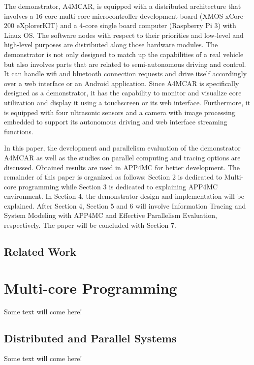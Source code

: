The demonstrator, A4MCAR, is equipped with a distributed architecture that involves a 16-core multi-core microcontroller development board (XMOS xCore-200 eXplorerKIT) and a 4-core single board computer (Raspberry Pi 3) with Linux OS. The software nodes with respect to their priorities and low-level and high-level purposes are distributed along those hardware modules. The demonstrator is not only designed to match up the capabilities of a real vehicle but also involves parts that are related to semi-autonomous driving and control. It can handle wifi and bluetooth connection requests and drive itself accordingly over a web interface or an Android application. Since A4MCAR is specifically designed as a demonstrator, it has the capability to monitor and visualize core utilization and display it using a touchscreen or its web interface. Furthermore, it is equipped with four ultrasonic sensors and a camera with image processing embedded to support its autonomous driving and web interface streaming functions.

In this paper, the development and parallelism evaluation of the demonstrator A4MCAR as well as the studies on parallel computing and tracing options are discussed. Obtained results are used in APP4MC for better development. The remainder of this paper is organized as follows: Section 2 is dedicated to Multi-core programming while Section 3 is dedicated to explaining APP4MC environment. In Section 4, the demonstrator design and implementation will be explained. After Section 4, Section 5 and 6 will involve Information Tracing and System Modeling with APP4MC and Effective Parallelism Evaluation, respectively. The paper will be concluded with Section 7.

\section{Related Work}

\chapter{Multi-core Programming}  %
Some text will come here! \\
\section{Distributed and Parallel Systems} %
Some text will come here! \\
